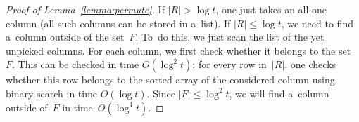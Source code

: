 \begin{proof}[Proof of Lemma~\ref{lemma:permute}]
If $|R| > \log t$, one just takes an all-one column (all such columns
can be stored in a~list). If $|R| \le \log t$, we need to find a~column outside
of the set~$F$. To~do this, we just scan the list of the yet unpicked columns. For
each column, we first check whether it belongs to the set~$F$. This can be
checked in time $O(\log^2t)$: for every row in~$|R|$, one checks whether this
row belongs to the sorted array of the considered column using binary search in
time $O(\log t)$. Since $|F| \le \log^2t$, we will find a~column outside of~$F$
in time~$O(\log^4 t)$.

\end{proof}
